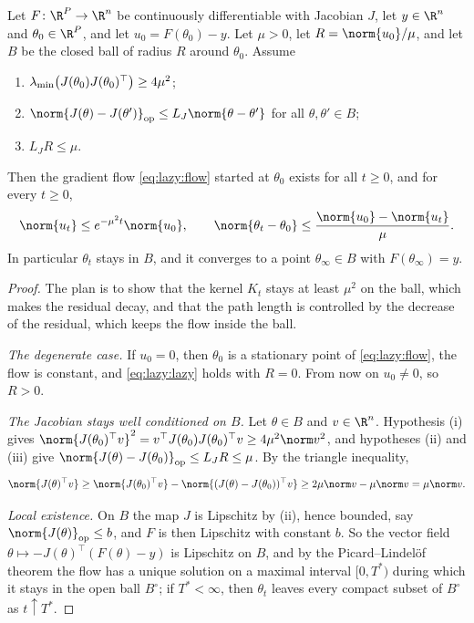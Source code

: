 \begin{refsection}
\begin{theorem}\label{thm:lazy:lazy}
Let $F\colon\R^P\to\R^n$ be continuously differentiable with Jacobian $J$, let $y\in\R^n$ and $\theta_0\in\R^P$, and let $u_0=F(\theta_0)-y$. Let $\mu>0$, let $R=\norm{u_0}/\mu$, and let $B$ be the closed ball of radius $R$ around $\theta_0$. Assume
\begin{enumerate}
\item $\lambda_{\min}\bigl(J(\theta_0)J(\theta_0)^\top\bigr)\ge4\mu^2$;
\item $\norm{J(\theta)-J(\theta')}_{\op}\le L_J\norm{\theta-\theta'}$ for all $\theta,\theta'\in B$;
\item $L_JR\le\mu$.
\end{enumerate}
Then the gradient flow \eqref{eq:lazy:flow} started at $\theta_0$ exists for all $t\ge0$, and for every $t\ge0$,
\begin{equation}\label{eq:lazy:lazy}
  \norm{u_t}\le e^{-\mu^2t}\norm{u_0},\qquad \norm{\theta_t-\theta_0}\le\frac{\norm{u_0}-\norm{u_t}}\mu .
\end{equation}
In particular $\theta_t$ stays in $B$, and it converges to a point $\theta_\infty\in B$ with $F(\theta_\infty)=y$.
\end{theorem}

\begin{proof}
The plan is to show that the kernel $K_t$ stays at least $\mu^2$ on the ball, which makes the residual decay, and that the path length is controlled by the decrease of the residual, which keeps the flow inside the ball.

\emph{The degenerate case.} If $u_0=0$, then $\theta_0$ is a stationary point of \eqref{eq:lazy:flow}, the flow is constant, and \eqref{eq:lazy:lazy} holds with $R=0$. From now on $u_0\ne0$, so $R>0$.

\emph{The Jacobian stays well conditioned on $B$.} Let $\theta\in B$ and $v\in\R^n$. Hypothesis (i) gives $\norm{J(\theta_0)^\top v}^2=v^\top J(\theta_0)J(\theta_0)^\top v\ge4\mu^2\norm v^2$, and hypotheses (ii) and (iii) give $\norm{J(\theta)-J(\theta_0)}_{\op}\le L_JR\le\mu$. By the triangle inequality,
\begin{equation}\label{eq:lazy:cond}
  \norm{J(\theta)^\top v}\ge\norm{J(\theta_0)^\top v}-\norm{(J(\theta)-J(\theta_0))^\top v}\ge2\mu\norm v-\mu\norm v=\mu\norm v .
\end{equation}

\emph{Local existence.} On $B$ the map $J$ is Lipschitz by (ii), hence bounded, say $\norm{J(\theta)}_{\op}\le b$, and $F$ is then Lipschitz with constant $b$. So the vector field $\theta\mapsto-J(\theta)^\top(F(\theta)-y)$ is Lipschitz on $B$, and by the Picard--Lindel\"of theorem the flow has a unique solution on a maximal interval $[0,T^*)$ during which it stays in the open ball $B^\circ$; if $T^*<\infty$, then $\theta_t$ leaves every compact subset of $B^\circ$ as $t\uparrow T^*$.


\end{proof}
\end{refsection}
